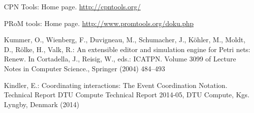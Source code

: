 \begin{thebibliography}{10}
{CPN Tools}:
\newblock Home page.
\newblock \url{http://cpntools.org/}

PRoM tools:
\newblock Home page.
\newblock \url{http://www.promtools.org/doku.php}

Kummer, O., Wienberg, F., Duvigneau, M., Schumacher, J., K{\"o}hler, M., Moldt,
  D., R{\"o}lke, H., Valk, R.:
\newblock An extensible editor and simulation engine for {Petri} nets: Renew.
\newblock In Cortadella, J., Reisig, W., eds.: ICATPN. Volume 3099 of Lecture
  Notes in Computer Science., Springer (2004)  484--493

Kindler, E.:
\newblock Coordinating interactions: The {Event Coordination Notation}.
\newblock Technical Report DTU Compute Technical Report 2014-05, DTU Compute,
  Kgs. Lyngby, Denmark (2014)

\end{thebibliography}
